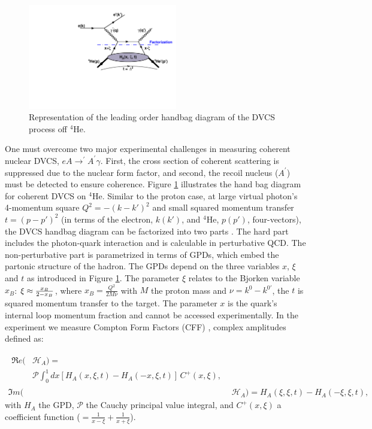 \documentclass[twocolumn,nofootinbib,showpacs,prl,superscriptaddress,secnumarabic,amssymb,nobibnotes,aps,floatfix]{revtex4}
\begin{document}
\begin{figure}[tb]
\includegraphics[width=6.5cm]{figs/DVCS_diagram.pdf}
\caption{Representation of the leading order handbag diagram of the 
DVCS process off $^4$He.}
\label{fig:diags}
\end{figure}

One must overcome two major experimental challenges in measuring coherent 
nuclear DVCS, $eA\rightarrow^\prime A^\prime\gamma$. First, the cross section 
of coherent scattering is suppressed due to the nuclear form factor, and 
second, the recoil nucleus ($A^\prime$) must be detected to ensure coherence. 
Figure \ref{fig:diags} 
illustrates the hand bag diagram for coherent DVCS on $^4$He.  Similar to the 
proton case, at large virtual photon's 4-momentum square $Q^2=-(k-k')^{2}$ and 
small squared momentum transfer $t=(p-p')^{2}$ (in terms of the electron, 
$k(k')$, and $^4$He, $p(p')$, four-vectors), the DVCS handbag diagram can be 
factorized into two parts \cite{Freund_Collins,Ji_Osborne}. The hard part 
includes the photon-quark interaction and is calculable in perturbative QCD.  
The non-perturbative part is parametrized in terms of GPDs, which embed the 
partonic structure of the hadron. The GPDs depend on the three variables $x$, 
$\xi$ and $t$ as introduced in Figure \ref{fig:diags}. The parameter $\xi$
relates to the Bjorken variable $x_{B}$: $\xi\approx {{x_B}\over{2-x_B}}$, 
where $x_B=\frac{Q^2}{2M\nu}$ with $M$ the proton mass and  
$\nu=k^0-k^{0\prime}$, the $t$ is squared momentum transfer to the target. The 
parameter $x$ is the quark's internal loop momentum fraction and cannot be 
accessed experimentally. In the experiment we measure Compton Form
Factors (CFF) \cite{Guidal:2013rya}, complex amplitudes defined as:

\begin{align}
\begin{split}
\Re e(&\mathcal{H}_{A}) = \\
    &\mathcal{P} 
\int_{0}^{1}dx[H_A(x,\xi,t)-H_A(-x,\xi,t)] \, C^{+}(x,\xi), 
\end{split} \\
\Im m(&\mathcal{H}_{A}) = H_A(\xi,\xi,t)-H_A(-\xi,\xi,t),
\end{align}
with $H_A$ the GPD, $\mathcal{P}$ 
the Cauchy principal value integral, and $C^{+}(x,\xi)$ a coefficient function 
($=  \frac{1}{x-\xi} + \frac{1}{x+\xi}$).
\end{document}
